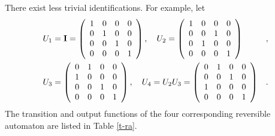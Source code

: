 There exist less trivial identifications. For example,
let
\begin{eqnarray*}
&{U_1}={\Bbb I}=
\left(
\begin{array}{cccc}
1&0&0&0 \\
0&1&0&0\\
0&0&1&0\\
0&0&0&1
\end{array}
\right)
,\quad
{U_2}=
\left(
\begin{array}{cccc}
1&0&0&0\\
0&0&1&0 \\
0&1&0&0\\
0&0&0&1
\end{array}
\right)
&, \\
&{U_3}=
\left(
\begin{array}{cccc}
0&1&0&0        \\
1&0&0&0 \\
0&0&1&0\\
0&0&0&1
\end{array}
\right)
,\quad
{U_4}= U_2U_3=
\left(
\begin{array}{cccc}
0&1&0&0\\
0&0&1&0 \\
1&0&0&0\\
0&0&0&1
\end{array}
\right)&
.
\end{eqnarray*}
The transition and output functions of the four corresponding
reversible automaton are listed in Table
\ref{t-ra}.
